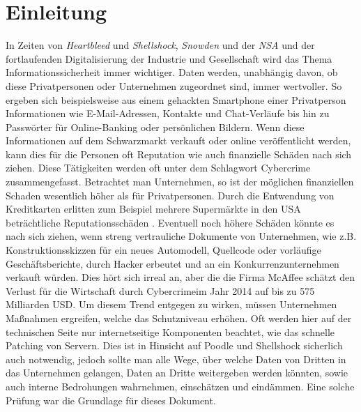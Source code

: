 \chapter{Einleitung}
In Zeiten von \textit{Heartbleed}\cite{Heartbleed} und  \textit{Shellshock}\cite{Shellshock}, \textit{Snowden} und der \textit{NSA}\cite{Snowden} und der fortlaufenden Digitalisierung der Industrie und Gesellschaft wird das Thema Informationssicherheit immer wichtiger. Daten werden, unabhängig davon, ob diese Privatpersonen oder Unternehmen zugeordnet sind, immer wertvoller. So ergeben sich beispielsweise aus einem gehackten Smartphone einer Privatperson Informationen wie E-Mail-Adressen, Kontakte und Chat-Verläufe bis hin zu Passwörter für Online-Banking oder persönlichen Bildern. Wenn diese Informationen auf dem Schwarzmarkt verkauft oder online veröffentlicht werden, kann dies für die Personen oft Reputation wie auch finanzielle Schäden nach sich ziehen. Diese Tätigkeiten werden oft unter dem Schlagwort Cybercrime zusammengefasst. Betrachtet man Unternehmen, so ist der möglichen finanziellen Schaden wesentlich höher als für Privatpersonen. Durch die Entwendung von Kreditkarten erlitten zum Beispiel mehrere Supermärkte in den USA beträchtliche Reputationsschäden \cite{HackKreditkarten}\cite{HackKreditkarten2}. Eventuell noch höhere Schäden könnte es nach sich ziehen, wenn streng vertrauliche Dokumente von Unternehmen, wie z.B. Konstruktionsskizzen für ein neues Automodell, Quellcode oder vorläufige Geschäftsberichte, durch Hacker erbeutet und an ein Konkurrenzunternehmen verkauft würden. Dies hört sich irreal an, aber die die Firma McAffee schätzt den Verlust für die Wirtschaft durch \glqq Cybercrime\grqq im Jahr 2014 auf bis zu 575 Milliarden USD\cite{McAffee}. 
Um diesem Trend entgegen zu wirken, müssen Unternehmen Maßnahmen ergreifen, welche das Schutzniveau erhöhen. Oft werden hier auf der technischen Seite nur internetseitige Komponenten beachtet, wie das schnelle Patching von Servern. Dies ist in Hinsicht auf  Poodle und Shellshock sicherlich auch notwendig, jedoch sollte man alle Wege, über welche Daten von Dritten in das Unternehmen gelangen, Daten an Dritte weitergeben werden könnten, sowie auch interne Bedrohungen wahrnehmen, einschätzen und eindämmen. Eine solche Prüfung war die Grundlage für dieses Dokument.